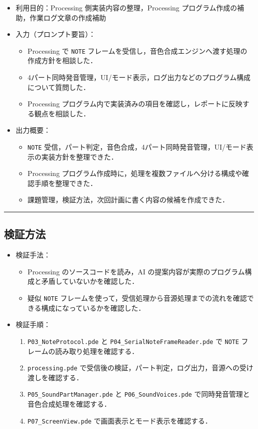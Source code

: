 \documentclass[uplatex,dvipdfmx,a4paper,11pt]{jsarticle}
\newcommand{\sectionrule}{\par\medskip\noindent\rule{\linewidth}{0.6pt}\par\medskip}
\begin{document}
\begin{itemize}
  \item 利用目的：Processing 側実装内容の整理，Processing プログラム作成の補助，作業ログ文章の作成補助
  \item 入力（プロンプト要旨）：
    \begin{itemize}
      \item Processing で \texttt{NOTE} フレームを受信し，音色合成エンジンへ渡す処理の作成方針を相談した．
      \item 4パート同時発音管理，UI/モード表示，ログ出力などのプログラム構成について質問した．
      \item Processing プログラム内で実装済みの項目を確認し，レポートに反映する観点を相談した．
    \end{itemize}
  \item 出力概要：
    \begin{itemize}
      \item \texttt{NOTE} 受信，パート判定，音色合成，4パート同時発音管理，UI/モード表示の実装方針を整理できた．
      \item Processing プログラム作成時に，処理を複数ファイルへ分ける構成や確認手順を整理できた．
      \item 課題管理，検証方法，次回計画に書く内容の候補を作成できた．
    \end{itemize}
\end{itemize}

\sectionrule

\subsection{検証方法}

\begin{itemize}
  \item 検証手法：
    \begin{itemize}
      \item Processing のソースコードを読み，AI の提案内容が実際のプログラム構成と矛盾していないかを確認した．
      \item 疑似 \texttt{NOTE} フレームを使って，受信処理から音源処理までの流れを確認できる構成になっているかを確認した．
    \end{itemize}
  \item 検証手順：
    \begin{enumerate}
      \item \texttt{P03\_NoteProtocol.pde} と \texttt{P04\_SerialNoteFrameReader.pde} で \texttt{NOTE} フレームの読み取り処理を確認する．
      \item \texttt{processing.pde} で受信後の検証，パート判定，ログ出力，音源への受け渡しを確認する．
      \item \texttt{P05\_SoundPartManager.pde} と \texttt{P06\_SoundVoices.pde} で同時発音管理と音色合成処理を確認する．
      \item \texttt{P07\_ScreenView.pde} で画面表示とモード表示を確認する．
    \end{enumerate}
\end{itemize}
\end{document}
